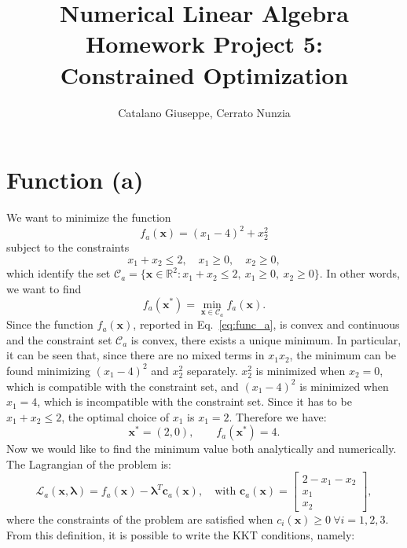 \documentclass[a4paper,11pt]{article}
\newcommand{\R}{\mathbb{R}}
\begin{document}
	\author{Catalano Giuseppe, Cerrato Nunzia}
	\title{Numerical Linear Algebra Homework Project 5:\\Constrained Optimization}
	\date{}
	\maketitle
	
\section{Function (a)}

We want to minimize the function
\begin{equation}
	f_a(\textbf{x}) = (x_{1}-4)^2 + x_{2}^{2}
	\label{eq:func_a}
\end{equation}
subject to the constraints
\begin{equation}
	x_{1} + x_{2} \le 2, \quad x_{1} \ge 0, \quad x_{2} \ge 0,
	\label{eq:constr_a}
\end{equation}
which identify the set $\mathcal{C}_a = \{ \textbf{x} \in \R^2 : x_{1} + x_{2} \le 2, \ x_{1} \ge 0, \ x_{2} \ge 0 \}$. In other words, we want to find 
\begin{equation}
	f_a(\textbf{x}^*) = \min_{\textbf{x} \in \mathcal{C}_a} f_a(\textbf{x}).
\end{equation}
\noindent Since the function $f_a(\textbf{x})$, reported in Eq.~\eqref{eq:func_a}, is convex and continuous and the constraint set $\mathcal{C}_a$ is convex, there exists a unique minimum. In particular, it can be seen that, since there are no mixed terms in $x_1 x_2$, the minimum can be found minimizing $(x_{1}-4)^2$ and $x_{2}^{2}$ separately. $x_{2}^{2}$ is minimized when $x_{2} = 0$, which is compatible with the constraint set, and $(x_{1}-4)^2$ is minimized when $ x_{1} = 4$, which is incompatible with the constraint set. Since it has to be $x_{1} + x_{2} \le 2$, the optimal choice of $x_1$ is $x_1 = 2$. Therefore we have:
\begin{equation}
	\textbf{x}^* = (2,0),\qquad  f_a(\textbf{x}^*) = 4.
\end{equation}
\noindent Now we would like to find the minimum value both analytically and numerically.\\

\noindent The Lagrangian of the problem is:
\begin{equation}
	\mathcal{L}_a(\textbf{x},\boldsymbol{\lambda}) = f_a(\textbf{x}) - \boldsymbol{\lambda}^T \textbf{c}_a(\textbf{x}), \quad \text{with } \textbf{c}_a(\textbf{x}) = \begin{bmatrix}
		2 - x_1 - x_2\\
		x_1\\
		x_2
	\end{bmatrix},
\end{equation}
where the constraints of the problem are satisfied when $c_i(\textbf{x})\ge 0\ \forall i = 1,2,3$. From this definition, it is possible to write the KKT conditions, namely:
 
\end{document}
